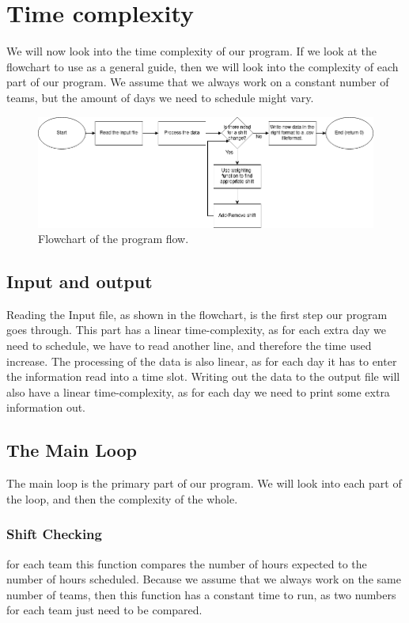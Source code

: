 \section{Time complexity}
We will now look into the time complexity of our program. If we look at the flowchart to use as a general guide, then we will look into the complexity of each part of our program. We assume that we always work on a constant number of teams, but the amount of days we need to schedule might vary.

\begin{figure}[ht!]
    \centering
    \includegraphics[width=\textwidth]{media/Flowcharts/General Flowchart.png}
    \caption{Flowchart of the program flow.}
    \label{fig:Main_Flowchart2}
\end{figure}

\subsection{Input and output}
Reading the Input file, as shown in the flowchart, is the first step our program goes through. This part has a linear time-complexity, as for each extra day we need to schedule, we have to read another line, and therefore the time used increase. The processing of the data is also linear, as for each day it has to enter the information read into a time slot. Writing out the data to the output file will also have a linear time-complexity, as for each day we need to print some extra information out.

\subsection{The Main Loop}
The main loop is the primary part of our program. We will look into each part of the loop, and then the complexity of the whole.

\subsubsection{Shift Checking}
for each team this function compares the number of hours expected to the number of hours scheduled. Because we assume that we always work on the same number of teams, then this function has a constant time to run, as two numbers for each team just need to be compared.

